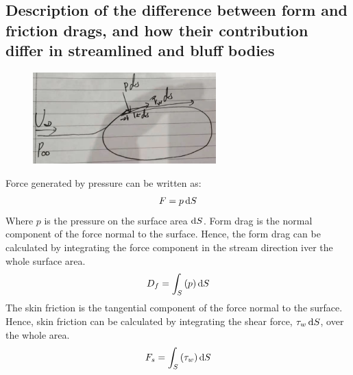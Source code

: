 \documentclass[11pt]{article}
\begin{document}
\subsection*{Description of the difference between form and friction drags, and how their contribution differ in streamlined and bluff bodies}
\begin{figure}[H]
  \centering
  \includegraphics[width = 0.5 \textwidth]{./img/diagram2.png}
  \caption{}
\end{figure}
Force generated by pressure can be written as:
\begin{align}
  F = p \dif S
\end{align}
Where $p$ is the pressure on the surface area $\dif S$. Form drag is the normal component of the force normal to the surface. Hence, the form drag can be calculated by integrating the force component in the stream direction iver the whole surface area.
\begin{align}
  D_f = \int_S \left(p\right)\dif S
\end{align}
The skin friction is the tangential component of the force normal to the surface. Hence, skin friction can be calculated by integrating the shear force, $\tau_w \dif S$, over the whole area.
\begin{align}
  F_s = \int_S \left(\tau_w\right)\dif S
\end{align}
\end{document}
